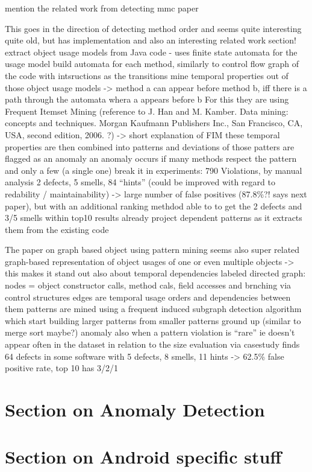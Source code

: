 mention the related work from detecting mmc paper

This \cite{wasylkowski2007detecting} goes in the direction of detecting method order and seems quite interesting
quite old, but has implementation and also an interesting related work section!
    extract object usage models from Java code - uses finite state automata for the usage model
    build automata for each method, similarly to control flow graph of the code with intsructions as the transitions
    mine temporal properties out of those object usage models -> method a can appear before method b, iff there is a path through the automata whera a appears before b
    For this they are using Frequent Itemset Mining (reference to J. Han and M. Kamber. Data mining: concepts and techniques. Morgan Kaufmann Publishers Inc., San Francisco, CA, USA, second edition, 2006. ?) -> short explanation of FIM
    these temporal properties are then combined into patterns and deviations of those patters are flagged as an anomaly
    an anomaly occurs if many methods respect the pattern and only a few (a single one) break it
    in experiments: 790 Violations, by manual analysis 2 defects, 5 smells, 84 ``hints'' (could be improved with regard to redability / maintainability)
    -> large number of false positives (87.8\%?! says next paper), but with an additional ranking methdod able to to get the 2 defects and 3/5 smells within top10 results
    already project dependent patterns as it extracts them from the existing code

The paper on graph based object using pattern mining seems also super related \cite{nguyen2009graph}
    graph-based representation of object usages of one or even multiple objects -> this makes it stand out
    also about temporal dependencies
    labeled directed graph: nodes = object constructor calls, method cals, field accesses and brnching via control structures
    edges are temporal usage orders and dependencies between them
    patterns are mined using a frequent induced subgraph detection algorithm which start building larger patterns from smaller patterns ground up (similar to merge sort maybe?)
    anomaly also when a pattern violation is ``rare'' ie doesn't appear often in the dataset in relation to the size
    evaluation via casestudy finds 64 defects in some software with 5 defects, 8 smells, 11 hints -> 62.5\% false positive rate, top 10 has 3/2/1

\section{Section on Anomaly Detection}

\section{Section on Android specific stuff}

